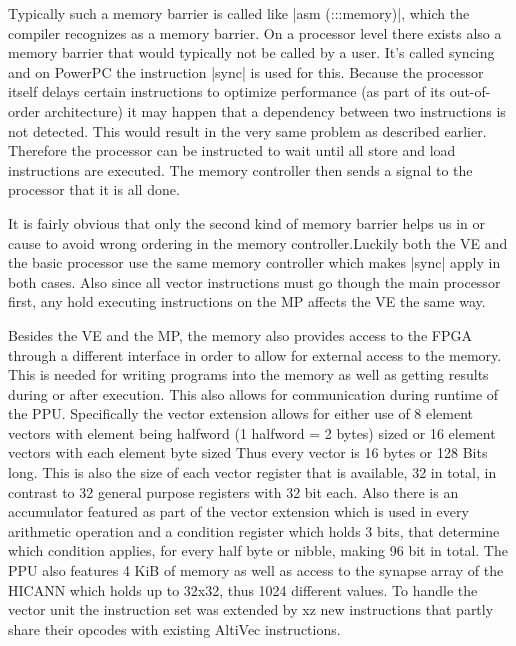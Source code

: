 Typically such a memory barrier is called like |asm (:::memory)|, which the compiler recognizes as a memory barrier.
On a processor level there exists also a memory barrier that would typically not be called by a user.
It's called syncing and on PowerPC the instruction |sync| is used for this.
Because the processor itself delays certain instructions to optimize performance (as part of its out-of-order architecture) it may happen that a dependency between two instructions is not detected.
This would result in the very same problem as described earlier.
Therefore the processor can be instructed to wait until all store and load instructions are executed.
The memory controller then sends a signal to the processor that it is all done.

It is fairly obvious that only the second kind of memory barrier helps us in or cause to avoid wrong ordering in the memory controller.Luckily both the VE and the basic processor use the same memory controller which makes |sync| apply in both cases.
Also since all vector instructions must go though the main processor first, any hold executing instructions on the MP affects the VE the same way.

Besides the VE and the MP, the memory also provides access to the FPGA through a different interface  in order to allow for external access to the memory.
This is needed for writing programs into the memory as well as getting results during or after execution.
This also allows for communication during runtime of the PPU.
Specifically the vector extension allows for either use of 8 element vectors with element being halfword (1 halfword = 2 bytes) sized or 16 element vectors with each element byte sized
Thus every vector is 16 bytes or 128 Bits long.
This is also the size of each vector register that is available, 32 in total, in contrast to 32 general purpose registers with 32 bit each.
Also there is an accumulator featured as part of the vector extension which is used in every arithmetic operation and a condition register which holds 3 bits, that determine which condition applies, for every half byte or nibble, making 96 bit in total.
The PPU also features 4 KiB of memory as well as access to the synapse array of the HICANN which holds up to 32x32, thus 1024 different values.
To handle the vector unit the instruction set was extended by xz  new instructions that partly share their opcodes with existing AltiVec instructions.


